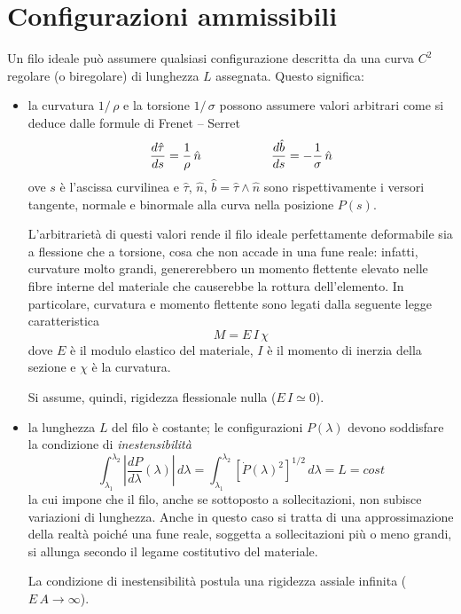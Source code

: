 \section*{Configurazioni ammissibili}
Un filo ideale può assumere qualsiasi configurazione descritta da una curva $C^2$ regolare (o biregolare) di lunghezza $L$ assegnata. Questo significa:
\begin{itemize}
	\item la curvatura $1/\,\rho$ e la torsione $1/\,\sigma$ possono assumere valori arbitrari come si deduce dalle formule di Frenet -- Serret
	\begin{equation*}
		\dfrac{d\hat{\tau}}{ds} = \dfrac{1}{\rho}\,\hat{n} \hspace*{2cm} \dfrac{d\hat{b}}{ds} = - \dfrac{1}{\sigma}\,\hat{n}
	\end{equation*}
	ove $s$ è l'ascissa curvilinea e $\hat{\tau}$, $\hat{n}$, $\hat{b} = \hat{\tau} \wedge \hat{n}$ sono rispettivamente i versori tangente, normale e binormale alla curva nella posizione $P(s)$.

	L'arbitrarietà di questi valori rende il filo ideale perfettamente deformabile sia a flessione che a torsione, cosa che non accade in una fune reale: infatti, curvature molto grandi, genererebbero un momento flettente elevato nelle fibre interne del materiale che causerebbe la rottura dell'elemento. In particolare, curvatura e momento flettente sono legati dalla seguente legge caratteristica
	\[
	M = E\,I\,\chi
	\]
	dove $E$ è il modulo elastico del materiale, $I$ è il momento di inerzia della sezione e $\chi$ è la curvatura.

	Si assume, quindi, rigidezza flessionale nulla ($E\,I\simeq 0$).
	\item la lunghezza $L$ del filo è costante; le configurazioni $P(\lambda)$ devono soddisfare la condizione di \emph{inestensibilità}
	\[
	\int_{\lambda_1}^{\lambda_2} \left| \dfrac{dP}{d\lambda}(\lambda) \right|\,d\lambda = \int_{\lambda_1}^{\lambda_2} [\dot{P}(\lambda)^2]^{1/2}\, d\lambda = L = cost
	\]
	la cui impone che il filo, anche se sottoposto a sollecitazioni, non subisce variazioni di lunghezza. Anche in questo caso si tratta di una approssimazione della realtà poiché una fune reale, soggetta a sollecitazioni più o meno grandi, si allunga secondo il legame costitutivo del materiale.

	La condizione di inestensibilità postula una rigidezza assiale infinita ($E\,A \to \infty$).
\end{itemize}

